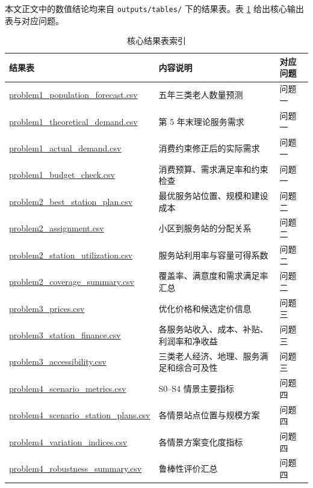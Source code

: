 本文正文中的数值结论均来自 \texttt{outputs/tables/} 下的结果表。表 \ref{tab:appendix-table-index} 给出核心输出表与对应问题。

\begin{table}[H]
  \centering
  \caption{核心结果表索引}
  \label{tab:appendix-table-index}
  \small
  \renewcommand{\arraystretch}{1.18}
  \begin{tabular}{p{}p{}p{}}
    \toprule
    结果表 & 内容说明 & 对应问题 \\
    \midrule
    \url{problem1_population_forecast.csv} & 五年三类老人数量预测 & 问题一 \\
    \url{problem1_theoretical_demand.csv} & 第 5 年末理论服务需求 & 问题一 \\
    \url{problem1_actual_demand.csv} & 消费约束修正后的实际需求 & 问题一 \\
    \url{problem1_budget_check.csv} & 消费预算、需求满足率和约束检查 & 问题一 \\
    \url{problem2_best_station_plan.csv} & 最优服务站位置、规模和建设成本 & 问题二 \\
    \url{problem2_assignment.csv} & 小区到服务站的分配关系 & 问题二 \\
    \url{problem2_station_utilization.csv} & 服务站利用率与容量可得系数 & 问题二 \\
    \url{problem2_coverage_summary.csv} & 覆盖率、满意度和需求满足率汇总 & 问题二 \\
    \url{problem3_prices.csv} & 优化价格和候选定价信息 & 问题三 \\
    \url{problem3_station_finance.csv} & 各服务站收入、成本、补贴、利润率和净收益 & 问题三 \\
    \url{problem3_accessibility.csv} & 三类老人经济、地理、服务满足和综合可及性 & 问题三 \\
    \url{problem4_scenario_metrics.csv} & S0--S4 情景主要指标 & 问题四 \\
    \url{problem4_scenario_station_plans.csv} & 各情景站点位置与规模方案 & 问题四 \\
    \url{problem4_variation_indices.csv} & 各情景方案变化度指标 & 问题四 \\
    \url{problem4_robustness_summary.csv} & 鲁棒性评价汇总 & 问题四 \\
    \bottomrule
  \end{tabular}
\end{table}

